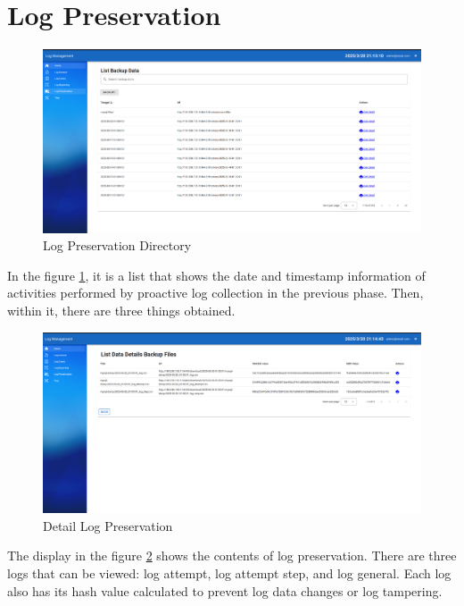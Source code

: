 \section{Log Preservation}
\begin{figure}[H] 
    \centering
    \includegraphics[width=14cm]{figure/log_preservation.png}
    \caption{Log Preservation Directory}
    \label{fig:log-preservation-1}
\end{figure}

In the figure \ref{fig:log-preservation-1}, it is a list that shows the date and timestamp information of activities performed by proactive log collection in the previous phase. Then, within it, there are three things obtained.

\begin{figure}[H] 
    \centering
    \includegraphics[width=14cm]{figure/log_preservation_detail.png}
    \caption{Detail Log Preservation}
    \label{fig:log-preservation-2}
\end{figure}

The display in the figure \ref{fig:log-preservation-2} shows the contents of log preservation. There are three logs that can be viewed: log attempt, log attempt step, and log general. Each log also has its hash value calculated to prevent log data changes or log tampering.

